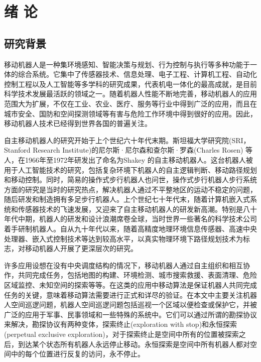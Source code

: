 \chapter{绪\hskip 0.4cm 论}

\section{研究背景}
移动机器人是一种集环境感知、智能决策与规划、行为控制与执行等多种功能于一体的综合系统。它集中了传感器技术、信息处理、电子工程、计算机工程、自动化控制工程以及人工智能等多学科的研究成果，代表机电一体化的最高成就，是目前科学技术发展最活跃的领域之一。随着机器人性能不断地完善，移动机器人的应用范围大为扩展，不仅在工业、农业、医疗、服务等行业中得到广泛的应用，而且在城市安全、国防和空间探测领域等有害与危险工作环境中得到很好的应用。因此，移动机器人技术已经得到世界各国的普遍关注。

自主移动机器人的研究开始于上个世纪六十年代末期。斯坦福大学研究院(SRI，Stanford Research Institute)的尼尔斯·尼尔森和查尔斯·罗森(Charles Rosen) 等人，在1966年至1972年研发出了命名为Shakey 的自主移动机器人。这台机器人被用于人工智能技术的研究，包括复杂环境下机器人的自主逻辑判断、移动路径规划和移动控制。同时，简易的操作式步行机器人也问世，操作式步行机器人步行系统方面的研究是当时的研究热点，解决机器人通过不平整地区的运动不稳定的问题，随后研发和制造拥有多足步行机器人。上个世纪七十年代末，随着计算机嵌入式系统和传感器技术的飞速发展，又迎来了自主移动机器人的研发新高潮。特别是八十年代中期，机器人的研发和设计浪潮席卷全球，当时世界一些著名的科学技术公司着手研制机器人。自从九十年代以来，随着高精度地理环境信息传感器、高速中央处理器、嵌入式控制技术等达到较高水平，以真实物理环境下路径规划技术为标志，对移动机器人开展了更深层次的研究。

许多应用设想在没有中央调度结构的情况下，移动机器人通过自主组织和相互协作，共同完成任务，包括地图的构建、环境检测、城市搜索救援、表面清理、危险区域监控、未知空间的探索等等。在这类的应用中移动算法是保证机器人共同完成任务的关键，意味着移动算法需要进行正式和详尽的验证。在本文中主要关注机器人空间巡逻问题，机器人空间巡逻问题包括巡视一个区域以便检查或保护它，并被广泛的应用于军事、民事领域和一些特殊的系统中。它们可以通过所谓的勘探协议来解决，勘探协议有两种变体，探索终止(exploration with stop)和永恒探索(perpetual exclusive exploration)，对于探索终止是空间中所有的位置被探索之后，到达某个状态所有机器人永远停止移动。永恒探索是空间中所有机器人都对空间中的每个位置进行反复的访问，永不停止。

